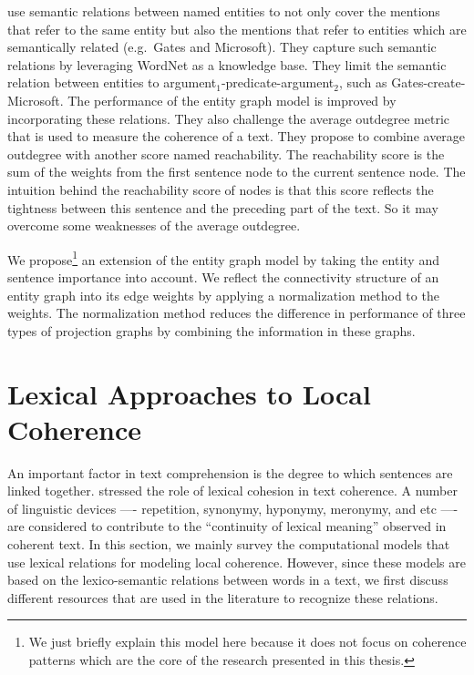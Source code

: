  use semantic relations between named entities to not only cover 
the mentions that refer to the same entity but also the mentions that refer to entities which are semantically related (e.g.\ Gates and Microsoft). 
They capture such semantic relations by leveraging WordNet \cite{baccianella10} as a knowledge base. 
They limit the semantic relation between entities to argument$_1$-predicate-argument$_2$, such as Gates-create-Microsoft. 
The performance of the entity graph model is improved by incorporating these relations. 
They also challenge the average outdegree metric that is used to measure the coherence of a text. 
They propose to combine average outdegree with another score named reachability. 
The reachability score is the sum of the weights from the first sentence node to the current sentence node. 
The intuition behind the reachability score of nodes is that this score reflects the tightness between this sentence and the preceding part of the text. 
So it may overcome some weaknesses of the average outdegree. 

We propose\footnote{We just briefly explain this model here because it does not focus on coherence patterns which are the core of the research presented in this thesis.} \cite{mesgar14} an extension of the entity graph model by taking the entity and sentence importance into account. 
We reflect the connectivity structure of an entity graph into its edge weights by applying a normalization method to the weights.  
The normalization method reduces the difference in performance of three types of projection graphs by combining the information in these graphs. 


\section{Lexical Approaches to Local Coherence}

An important factor in text comprehension is the degree to which sentences are linked together. 
 stressed the role of lexical cohesion in text coherence. 
A number of linguistic devices —- repetition, synonymy, hyponymy, meronymy, and etc —- are considered to contribute to the ``continuity of lexical meaning'' observed in coherent text. 
In this section, we mainly survey the computational models that use lexical relations for modeling local coherence. 
However, since these models are based on the lexico-semantic relations between words in a text, we first discuss different resources that are used in the literature to recognize these relations. 

